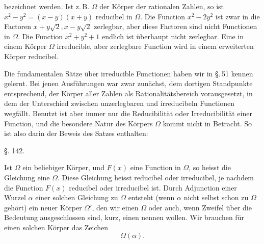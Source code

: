 
 bezeichnet werden. Ist z.\,B. $\Omega$ der Körper der rationalen Zahlen, so ist $x^2 - y^2 = (x - y)(x + y)$ reducibel in $\Omega$. Die Function $x^2 - 2y^2$ ist zwar in die Factoren $x + y\sqrt{2}, x - y\sqrt{2}$ zerlegbar, aber diese Factoren sind nicht Functionen in $\Omega$. Die Function $x^2 + y^2 + 1$ endlich ist überhaupt nicht zerlegbar. Eine in einem Körper $\Omega$ irreducible, aber zerlegbare Function wird in einem erweiterten Körper reducibel.

Die fundamentalen Sätze über irreducible Functionen haben wir in \S.\,51 kennen gelernt. Bei jenen Ausführungen war zwar zunächst, dem dortigen Standpunkte entsprechend, der Körper aller Zahlen als Rationalitätsbereich vorausgesetzt, in dem der Unterschied zwischen unzerlegbaren und irreducibeln Functionen wegfällt. Benutzt ist aber immer nur die Reducibilität oder Irreducibilität einer Function, und die besondere Natur des Körpers $\Omega$ kommt nicht in Betracht. So ist also darin der Beweis des Satzes enthalten:


\begin{center}
§. 142.\\
\end{center}

Ist $\Omega$ ein beliebiger Körper, und $F(x)$ eine Function in $\Omega$, so heisst die Gleichung
eine  $\Omega$. Diese Gleichung heisst reducibel oder irreducibel, je nachdem die Function $F(x)$ reducibel oder irreducibel ist. Durch Adjunction einer Wurzel $\alpha$ einer solchen Gleichung zu $\Omega$ entsteht (wenn $\alpha$ nicht selbst schon zu $\Omega$ gehört) ein neuer Körper $\Omega'$, den wir einen  \glqq{}\grqq{} $\Omega$ oder auch, wenn Zweifel über die Bedeutung ausgeschlossen sind, kurz, einen  nennen wollen. Wir brauchen für einen solchen Körper das Zeichen
\[ \Omega(\alpha). \]
